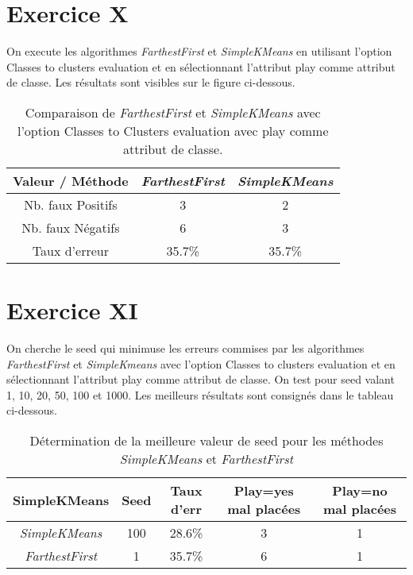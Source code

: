 \documentclass[a4paper, 11pt]{report}
\begin{document}
	\section{Exercice X}
	On execute les algorithmes \emph{FarthestFirst} et \emph{SimpleKMeans} en utilisant l'option Classes to clusters evaluation et en sélectionnant l'attribut play comme attribut de classe. Les résultats sont visibles sur le figure ci-dessous.

	\begin{table}[h!]
		\centering
		\begin{tabular}{|c|c|c|}
			\hline
			Valeur / Méthode & \emph{FarthestFirst} & \emph{SimpleKMeans} \\
			\hline
			Nb. faux Positifs & 3 & 2 \\
			\hline
			Nb. faux Négatifs & 6 & 3 \\
			\hline
			Taux d'erreur & 35.7\% & 35.7\% \\
			\hline
		\end{tabular}
		\caption{Comparaison de \emph{FarthestFirst} et \emph{SimpleKMeans} avec l'option Classes to Clusters evaluation avec play comme attribut de classe.}
		\label{tab:exo10}
	\end{table}

	\section{Exercice XI}
	On cherche le seed qui minimuse les erreurs commises par les algorithmes \emph{FarthestFirst} et \emph{SimpleKmeans} avec l'option Classes to clusters evaluation et en sélectionnant l'attribut play comme attribut de classe. On test pour seed valant 1, 10, 20, 50, 100 et 1000. Les meilleurs résultats sont consignés dans le tableau ci-dessous.

	\begin{table}[h!]
		\centering
		\begin{tabular}{|c|c|c|c|c|}
			\hline
			SimpleKMeans & Seed & Taux d'err & Play=yes mal placées & Play=no mal placées \\
			\hline
			\emph{SimpleKMeans} & 100 & 28.6\% & 3 & 1 \\
			\hline
			\emph{FarthestFirst} & 1 & 35.7\% & 6 & 1 \\
			\hline
		\end{tabular}
		\caption{Détermination de la meilleure valeur de seed pour les méthodes \emph{SimpleKMeans} et \emph{FarthestFirst}}
		\label{tab:exo11}
	\end{table}
\end{document}
